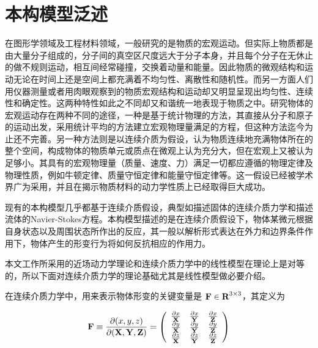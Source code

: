 \section{本构模型泛述}
\label{constitutive_model}
在图形学领域及工程材料领域，一般研究的是物质的宏观运动。但实际上物质都是由大量分子组成的，分子间的真空区尺度远大于分子本身，并且每个分子在无休止的做不规则运动，相互间经常碰撞，交换着动量和能量。因此物质的微观结构和运动无论在时间上还是空间上都充满着不均匀性、离散性和随机性。而另一方面人们用仪器测量或者用肉眼观察到的物质宏观结构和运动却又明显呈现出均匀性、连续性和确定性。这两种特性如此之不同却又和谐统一地表现于物质之中。研究物体的宏观运动存在两种不同的途径，一种是基于统计物理的方法，其直接从分子和原子的运动出发，采用统计平均的方法建立宏观物理量满足的方程，但这种方法迄今为止还不完善。另一种方法则是以连续介质为假设，认为物质连续地充满物体所在的整个空间，构成物体的物质单元或质点在微观上认为充分大，但在宏观上又被认为足够小。其具有的宏观物理量（质量、速度、力）满足一切都应遵循的物理定律及物理性质，例如牛顿定律、质量守恒定律和能量守恒定律等。这一假设已经被学术界广为采用，并且在揭示物质材料的动力学性质上已经取得巨大成功。

现有的本构模型几乎都基于连续介质假设，典型如描述固体的连续介质力学和描述流体的Navier-Stokes方程。本构模型描述的是在连续介质假设下，物体某微元根据自身状态以及周围状态所作出的反应，其一般以解析形式表达在外力和边界条件作用下，物体产生的形变行为将如何反抗相应的作用力。

本文工作所采用的近场动力学理论和连续介质力学中的线性模型在理论上是对等的，所以下面对连续介质力学的理论基础尤其是线性模型做必要介绍。

在连续介质力学中，用来表示物体形变的关键变量是 $\textbf{F} \in \textbf{R}^{3\times3}$，其定义为

\begin{equation}
\textbf{F} \equiv \frac{\partial(\boldmath{x}, \boldmath{y}, \boldmath{z})}{\partial(\textbf{X}, \textbf{Y}, \textbf{Z})}
=
\left(
  \begin{array}{ccc}
    \frac{\partial\boldmath{x}}{\textbf{X}}& \frac{\partial\boldmath{x}}{\textbf{Y}} & \frac{\partial\boldmath{x}}{\textbf{Z}} \\
    \frac{\partial\boldmath{y}}{\textbf{X}}& \frac{\partial\boldmath{y}}{\textbf{Y}} & \frac{\partial\boldmath{y}}{\textbf{Z}} \\
    \frac{\partial\boldmath{z}}{\textbf{X}}& \frac{\partial\boldmath{z}}{\textbf{Y}} & \frac{\partial\boldmath{z}}{\textbf{Z}} \\
  \end{array}
\right)
\end{equation}

